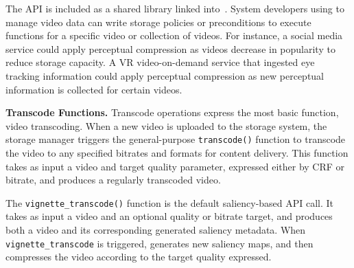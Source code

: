 \begin{table*}[h]
\centering
\label{table:policies}

\caption{\name API}

\end{table*}

The \name API is included as a shared library linked into~\lightdb.
System developers using \nameStore to manage video data can write storage policies or preconditions to execute \nameStore functions for a specific video or collection of videos.
For instance, a social media service could apply perceptual compression as videos decrease in popularity to reduce storage capacity.
A VR video-on-demand service that ingested eye tracking information could apply perceptual compression as new perceptual information is collected for certain videos.

\noindent\textbf{Transcode Functions.}
Transcode operations express the most basic \nameStore function, video transcoding.
When a new video is uploaded to the storage system, the storage manager triggers the general-purpose \texttt{transcode()} function to transcode the video to any specified bitrates and formats for content delivery.
This function takes as input a video and target quality parameter, expressed either by CRF or bitrate, and produces a regularly transcoded video.

The \texttt{vignette\_transcode()} function is the default saliency-based API call.
It takes as input a video and an optional quality or bitrate target, and produces both a video and its corresponding generated saliency metadata.
When \texttt{vignette\_transcode} is triggered, \nameStore generates new saliency maps, and then compresses the video according to the target quality expressed.

